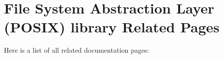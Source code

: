 \section{File System Abstraction Layer (POSIX) library Related Pages}
Here is a list of all related documentation pages:\begin{CompactList}
\item {}

\end{CompactList}
